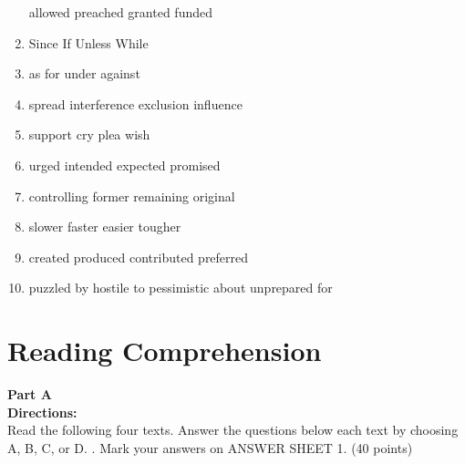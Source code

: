 \begin{enumerate}
\fourchoices
{allowed}
{preached}
{granted}
{funded}




\item


\fourchoices
{Since}
{If}
{Unless}
{While}




\item


\fourchoices
{as}
{for}
{under}
{against}




\item

\fourchoices
{spread}
{interference}
{exclusion}
{influence}




\item


\fourchoices
{support}
{cry}
{plea}
{wish}




\item


\fourchoices
{urged}
{intended}
{expected}
{promised}




\item


\fourchoices
{controlling}
{former}
{remaining}
{original}




\item


\fourchoices
{slower}
{faster}
{easier}
{tougher}




\item

\fourchoices
{created}
{produced}
{contributed}
{preferred}



\item

\fourchoices
{puzzled by}
{hostile to}
{pessimistic about}
{unprepared for}

\end{enumerate}

\vfil

\section{Reading Comprehension}


\noindent
\textbf{Part A}\\
\textbf{Directions:}\\
Read the following four texts. Answer the questions below each
text by choosing A, B, C, or D. . Mark your answers on ANSWER SHEET 1. (40 points)

